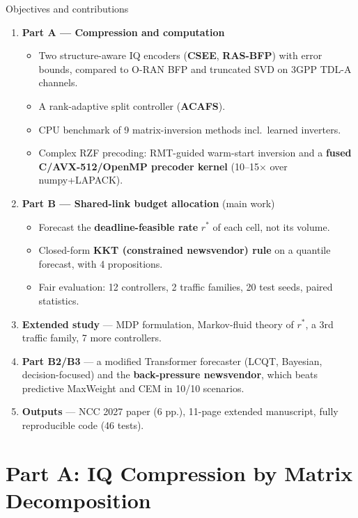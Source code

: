 \documentclass[aspectratio=169,11pt,xcolor=table]{beamer}
\newcommand{\rstar}{r^{\ast}}
\begin{document}
\begin{frame}{Objectives and contributions}
  \footnotesize
  \begin{enumerate}
    \item \textbf{Part A --- Compression and computation}
      \begin{itemize}
        \item Two structure-aware IQ encoders (\textbf{CSEE}, \textbf{RAS-BFP}) with error bounds, compared to O-RAN BFP and truncated SVD on 3GPP TDL-A channels.
        \item A rank-adaptive split controller (\textbf{ACAFS}).
        \item CPU benchmark of 9 matrix-inversion methods incl.\ learned inverters.
        \item Complex RZF precoding: RMT-guided warm-start inversion and a \textbf{fused C/AVX-512/OpenMP precoder kernel} (10--15$\times$ over numpy+LAPACK).
      \end{itemize}
    \item \textbf{Part B --- Shared-link budget allocation} (main work)
      \begin{itemize}
        \item Forecast the \textbf{deadline-feasible rate} $\rstar$ of each cell, not its volume.
        \item Closed-form \textbf{KKT (constrained newsvendor) rule} on a quantile forecast, with 4 propositions.
        \item Fair evaluation: 12 controllers, 2 traffic families, 20 test seeds, paired statistics.
      \end{itemize}
    \item \textbf{Extended study} --- MDP formulation, Markov-fluid theory of $\rstar$, a 3rd traffic family, 7 more controllers.
    \item \textbf{Part B2/B3} --- a modified Transformer forecaster (LCQT, Bayesian, decision-focused) and the \textbf{back-pressure newsvendor}, which beats predictive MaxWeight and CEM in 10/10 scenarios.
    \item \textbf{Outputs} --- NCC 2027 paper (6 pp.), 11-page extended manuscript, fully reproducible code (46 tests).
  \end{enumerate}
\end{frame}

\section{Part A: IQ Compression by Matrix Decomposition}
\end{document}
